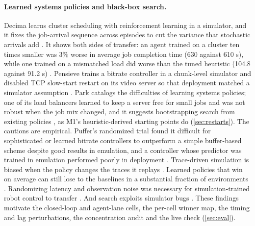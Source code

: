 \paragraph{Learned systems policies and black-box search.}
Decima learns cluster scheduling with reinforcement learning in a simulator, and it fixes the
job-arrival sequence across episodes to cut the variance that stochastic arrivals add
\citep{mao2019decima,mao2019inputdriven}. It shows both sides of transfer: an agent trained on a
cluster ten times smaller was 3\% worse in average job completion time (630 against 610 s),
while one trained on a mismatched load did worse than the tuned heuristic (104.8 against 91.2 s)
\citep{mao2019decima}.
Pensieve trains a bitrate controller in a chunk-level simulator and disabled TCP slow-start
restart on its video server so that deployment matched a simulator assumption
\citep{mao2017pensieve}.
Park catalogs the difficulties of learning systems policies; one of its load balancers learned to
keep a server free for small jobs and was not robust when the job mix changed, and it suggests
bootstrapping search from existing policies \citep{mao2019park}, as M1's heuristic-derived
starting points do (\cref{sec:restarts}).
The cautions are empirical. Puffer's randomized trial found it difficult for sophisticated or
learned bitrate controllers to outperform a simple buffer-based scheme despite good results in
emulation, and a controller whose predictor was trained in emulation performed poorly in
deployment
\citep{yan2020puffer}. Trace-driven simulation is biased when the policy changes the traces it
replays \citep{alomar2023causalsim}. Learned policies that win on average can still lose to the
baselines in a substantial fraction of environments \citep{xia2022genet}. Randomizing latency
and observation noise was necessary for simulation-trained robot control to transfer
\citep{peng2018sim2real}. And search exploits simulator bugs \citep{lehman2020creativity}. These
findings motivate the closed-loop and agent-lane cells, the per-cell winner map, the timing and
lag perturbations, the concentration audit and the live check (\cref{sec:eval}).

